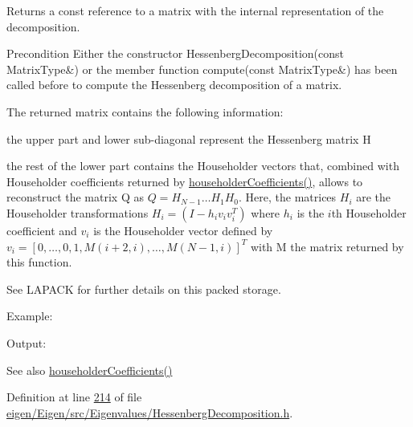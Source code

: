 \begin{DoxyReturn}{Returns}
a const reference to a matrix with the internal representation of the decomposition.
\end{DoxyReturn}
\begin{DoxyPrecond}{Precondition}
Either the constructor Hessenberg\+Decomposition(const Matrix\+Type\&) or the member function compute(const Matrix\+Type\&) has been called before to compute the Hessenberg decomposition of a matrix.
\end{DoxyPrecond}
The returned matrix contains the following information\+:
\begin{DoxyItemize}
\item the upper part and lower sub-\/diagonal represent the Hessenberg matrix H
\item the rest of the lower part contains the Householder vectors that, combined with Householder coefficients returned by \hyperlink{group___eigenvalues___module_a65fa81ce79d956baa59a30a6d82f8a84}{householder\+Coefficients()}, allows to reconstruct the matrix Q as $ Q = H_{N-1} \ldots H_1 H_0 $. Here, the matrices $ H_i $ are the Householder transformations $ H_i = (I - h_i v_i v_i^T) $ where $ h_i $ is the $ i $th Householder coefficient and $ v_i $ is the Householder vector defined by $ v_i = [ 0, \ldots, 0, 1, M(i+2,i), \ldots, M(N-1,i) ]^T $ with M the matrix returned by this function.
\end{DoxyItemize}

See L\+A\+P\+A\+CK for further details on this packed storage.

Example\+: 
\begin{DoxyCodeInclude}
\end{DoxyCodeInclude}
 Output\+: 
\begin{DoxyVerbInclude}
\end{DoxyVerbInclude}


\begin{DoxySeeAlso}{See also}
\hyperlink{group___eigenvalues___module_a65fa81ce79d956baa59a30a6d82f8a84}{householder\+Coefficients()} 
\end{DoxySeeAlso}


Definition at line \hyperlink{eigen_2_eigen_2src_2_eigenvalues_2_hessenberg_decomposition_8h_source_l00214}{214} of file \hyperlink{eigen_2_eigen_2src_2_eigenvalues_2_hessenberg_decomposition_8h_source}{eigen/\+Eigen/src/\+Eigenvalues/\+Hessenberg\+Decomposition.\+h}.

